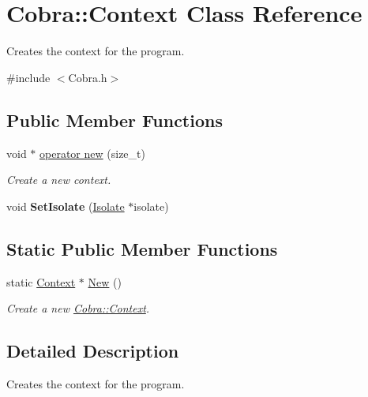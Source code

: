 \hypertarget{class_cobra_1_1_context}{\section{Cobra\+:\+:Context Class Reference}
\label{class_cobra_1_1_context}
}


Creates the context for the program.  




{\ttfamily \#include $<$Cobra.\+h$>$}

\subsection*{Public Member Functions}
\begin{DoxyCompactItemize}
\item 
void $\ast$ \hyperlink{class_cobra_1_1_context_ac34fa8ed39938076d0441adabcbc1cd5}{operator new} (size\+\_\+t)
\begin{DoxyCompactList}\small\item\em Create a new context. \end{DoxyCompactList}\item 
\hypertarget{class_cobra_1_1_context_ab0c0a9a4910865623f0c89b298609f48}{void {\bfseries Set\+Isolate} (\hyperlink{class_cobra_1_1_isolate}{Isolate} $\ast$isolate)}\label{class_cobra_1_1_context_ab0c0a9a4910865623f0c89b298609f48}

\end{DoxyCompactItemize}
\subsection*{Static Public Member Functions}
\begin{DoxyCompactItemize}
\item 
static \hyperlink{class_cobra_1_1_context}{Context} $\ast$ \hyperlink{class_cobra_1_1_context_af5e66888a00a8e0f350e603c2ccbfe9d}{New} ()
\begin{DoxyCompactList}\small\item\em Create a new \hyperlink{class_cobra_1_1_context}{Cobra\+::\+Context}. \end{DoxyCompactList}\end{DoxyCompactItemize}


\subsection{Detailed Description}
Creates the context for the program. 

